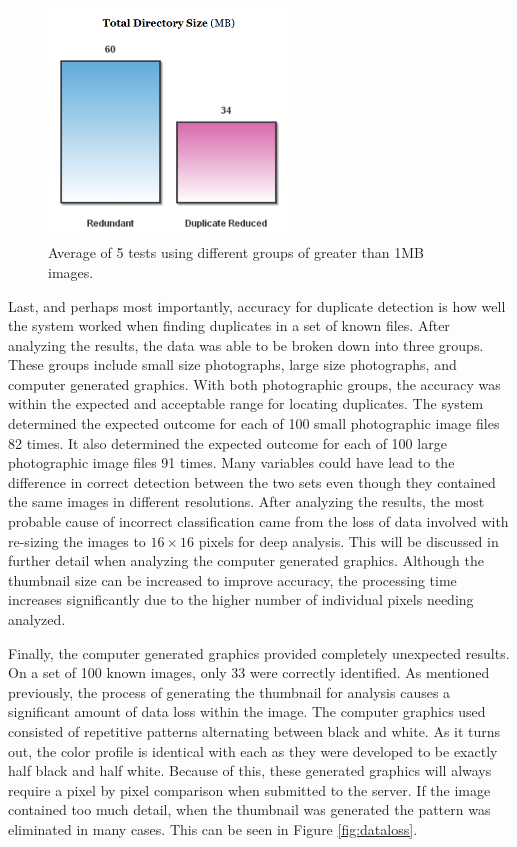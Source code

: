 \begin{figure}[htbp]
\centering
\includegraphics[width=2.5in]{largeaverage}
\caption{Average of 5 tests using different groups of greater than 1MB images.}
\label{fig:largeaverage}
\end{figure}

Last, and perhaps most importantly, accuracy for duplicate detection is how well the system worked when finding duplicates in a set of known files. After analyzing the results, the data was able to be broken down into three groups. These groups include small size photographs, large size photographs, and computer generated graphics. With both photographic groups, the accuracy was within the expected and acceptable range for locating duplicates. The system determined the expected outcome for each of 100 small photographic image files 82 times. It also determined the expected outcome for each of 100 large photographic image files 91 times. Many variables could have lead to the difference in correct detection between the two sets even though they contained the same images in different resolutions. After analyzing the results, the most probable cause of incorrect classification came from the loss of data involved with re-sizing the images to $16 \times 16$ pixels for deep analysis. This will be discussed in further detail when analyzing the computer generated graphics. Although the thumbnail size can be increased to improve accuracy, the processing time increases significantly due to the higher number of individual pixels needing analyzed.

Finally, the computer generated graphics provided completely unexpected results. On a set of 100 known images, only 33 were correctly identified. As mentioned previously, the process of generating the thumbnail for analysis causes a significant amount of data loss within the image. The computer graphics used consisted of repetitive patterns alternating between black and white. As it turns out, the color profile is identical with each as they were developed to be exactly half black and half white. Because of this, these generated graphics will always require a pixel by pixel comparison when submitted to the server. If the image contained too much detail, when the thumbnail was generated the pattern was eliminated in many cases. This can be seen in Figure \ref{fig:dataloss}.

